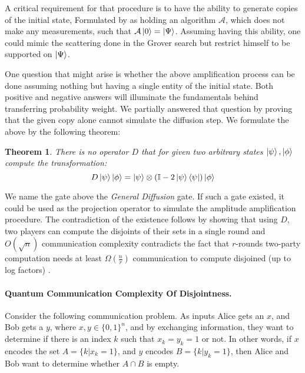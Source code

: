 \documentclass{article}
\newtheorem{theorem}{Theorem}
\begin{document}
  A critical requirement for that procedure is to have the ability to generate copies of the initial state, Formulated by \cite{Brassard_2002} as holding an algorithm $\mathcal{A}$, which does not make any measurements, such that $\mathcal{A}\ket{0}=\ket{\Psi}$. Assuming having this ability, one could mimic the scattering done in the Grover search but restrict himself to be supported on $\ket{\Psi}$. 


  One question that might arise is whether the above amplification process can be done assuming nothing but having a single entity of the initial state. Both positive and negative answers will illuminate the fundamentals behind transferring probability weight. We partially answered that question by proving that the given copy alone cannot simulate the diffusion step. We formulate the above by the following theorem: 

  \begin{theorem} \textit{ There is no operator $D$ that for given two arbitrary states $\ket{\psi},\ket{\phi}$ compute the transformation:} 
\begin{equation*}
    D \ket{\psi}\ket{\phi} = \ket{\psi}\otimes\left( \mathbb{I} - 2 \ket{\psi}\bra{\psi} \right)\ket{\phi} 
\end{equation*}
\end{theorem}

We name the gate above the \textit{General Diffusion} gate. If such a gate existed, it could be used as the projection operator to simulate the amplitude amplification procedure. The contradiction of the existence follows by showing that using $D$, two players can compute the disjoints of their sets in a single round and $O\left( \sqrt{n} \right)$ communication complexity contradicts the fact that $r$-rounds two-party computation needs at least $\Omega\left( \frac{n}{r} \right)$ communication to compute disjoined (up to log factors) \cite{Braverman}.    

\paragraph{Quantum Communication Complexity Of Disjointness.}
Consider the following communication problem.
As inputs Alice gets an \(x\), and Bob gets a \(y\), where \(x, y \in \{0, 1\}^n \), and by exchanging information, they want to determine if there is an index \(k\) such that \(x_k = y_k = 1 \) or not. 
In other words, if \(x\) encodes the set \(A = \{k | x_k = 1\} \), and \(y\) encodes \(B = \{k | y_k = 1\}\), 
then Alice and Bob want to determine whether \( A \cap B \) is empty.
\end{document}
